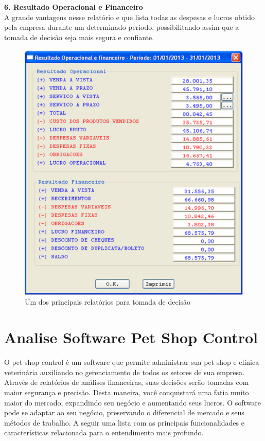 \documentclass[12pt,openright,twoside,a4paper,english,french,spanish,brazil]{abntex2}
\begin{document}
\textbf{6.	{Resultado Operacional e Financeiro}}\\
A grande vantagens nesse relatório e que lista todas as despesas e lucros obtido pela empresa durante um determinado período, possibilitando assim que a tomada de decisão seja mais segura e confiante.

\begin{figure}[htb!]
\includegraphics[scale=0.4]{relatorio_operacional_financeiro} 
\centering
\caption{Um dos principais relatórios para tomada de decisão}
\label{img_operacional_financeiro}
\end{figure}

\section*{Analise Software Pet Shop Control}
O pet shop control é um software que permite administrar sua pet shop e clínica veterinária auxiliando no gerenciamento de todos os setores de sua empresa. Através de relatórios de análises financeiras, suas decisões serão tomadas com maior segurança e precisão. Desta maneira, você conquistará uma fatia muito maior do mercado, expandindo seu negócio e aumentando seus lucros. O software pode se adaptar ao seu negócio, preservando o diferencial de mercado e seus métodos de trabalho.
A seguir uma lista com as principais funcionalidades e características relacionada para o entendimento mais profundo.
\end{document}
